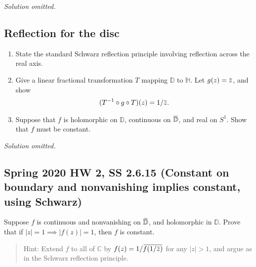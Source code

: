 \emph{Solution omitted.}

\hypertarget{reflection-for-the-disc}{%
\subsection{Reflection for the disc}\label{reflection-for-the-disc}}

\begin{problem}[?]

\begin{enumerate}
\def\labelenumi{\alph{enumi}.}
\item
  State the standard Schwarz reflection principle involving reflection
  across the real axis.
\item
  Give a linear fractional transformation \(T\) mapping \({\mathbb{D}}\)
  to \({\mathbb{H}}\). Let
  \(g(z) = \mkern 1.5mu\overline{\mkern-1.5muz\mkern-1.5mu}\mkern 1.5mu\),
  and show
  \begin{align*}  
  (T^{-1} \circ g \circ T)(z) = 1/\mkern 1.5mu\overline{\mkern-1.5muz\mkern-1.5mu}\mkern 1.5mu
  .\end{align*}
\item
  Suppose that \(f\) is holomorphic on \({\mathbb{D}}\), continuous on
  \(\mkern 1.5mu\overline{\mkern-1.5mu{\mathbb{D}}\mkern-1.5mu}\mkern 1.5mu\),
  and real on \(S^1\). Show that \(f\) must be constant.
\end{enumerate}

\end{problem}

\emph{Solution omitted.}

\hypertarget{spring-2020-hw-2-ss-2.6.15-constant-on-boundary-and-nonvanishing-implies-constant-using-schwarz}{%
\subsection{Spring 2020 HW 2, SS 2.6.15 (Constant on boundary and
nonvanishing implies constant, using
Schwarz)}\label{spring-2020-hw-2-ss-2.6.15-constant-on-boundary-and-nonvanishing-implies-constant-using-schwarz}}

\begin{problem}[?]

Suppose \(f\) is continuous and nonvanishing on
\(\mkern 1.5mu\overline{\mkern-1.5mu{\mathbb{D}}\mkern-1.5mu}\mkern 1.5mu\),
and holomorphic in \({\mathbb{D}}\). Prove that if
\({\left\lvert {z} \right\rvert} = 1 \implies {\left\lvert {f(z)} \right\rvert} = 1\),
then \(f\) is constant.

\begin{quote}
Hint: Extend \(f\) to all of \({\mathbb{C}}\) by
\(f(z) = 1/ \mkern 1.5mu\overline{\mkern-1.5muf(1/\mkern 1.5mu\overline{\mkern-1.5muz\mkern-1.5mu}\mkern 1.5mu)\mkern-1.5mu}\mkern 1.5mu\)
for any \({\left\lvert {z} \right\rvert} > 1\), and argue as in the
Schwarz reflection principle.
\end{quote}

\end{problem}

